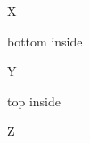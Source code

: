 \documentclass[12pt]{article}
\begin{document}
X \parbox[t][3cm][b]{3cm}{bottom inside} Y \parbox[b][2cm][t]{2cm}{top inside} Z
\end{document}
